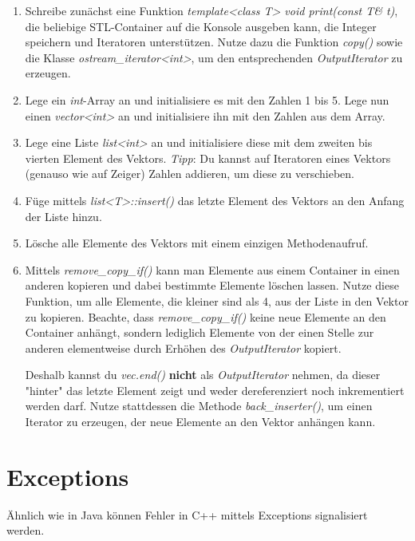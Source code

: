 \begin{enumerate}
\item 
Schreibe zunächst eine Funktion \emph{template<class T> void print(const T\& t)}, die beliebige STL-Container auf die Konsole ausgeben kann, die Integer speichern und Iteratoren unterstützen.
Nutze dazu die Funktion \emph{copy()} sowie die Klasse \emph{ostream\_iterator<int>}, um den entsprechenden \emph{OutputIterator} zu erzeugen.

\item
Lege ein \emph{int}-Array an und initialisiere es mit den Zahlen 1 bis 5.
Lege nun einen \emph{vector<int>} an und initialisiere ihn mit den Zahlen aus dem Array.

\item
Lege eine Liste \emph{list<int>} an und initialisiere diese mit dem zweiten bis vierten Element des Vektors.
\emph{Tipp}: Du kannst auf Iteratoren eines Vektors (genauso wie auf Zeiger) Zahlen addieren, um diese zu verschieben.

\item
Füge mittels \emph{list<T>::insert()} das letzte Element des Vektors an den Anfang der Liste hinzu.

\item
Lösche alle Elemente des Vektors mit einem einzigen Methodenaufruf.

\item
Mittels \emph{remove\_copy\_if()} kann man Elemente aus einem Container in einen anderen kopieren und dabei bestimmte Elemente löschen lassen.
Nutze diese Funktion, um alle Elemente, die kleiner sind als 4, aus der Liste in den Vektor zu kopieren. Beachte, dass \emph{remove\_copy\_if()} keine neue Elemente an den Container anhängt, sondern lediglich Elemente von der einen Stelle zur anderen elementweise durch Erhöhen des \emph{OutputIterator} kopiert.

Deshalb kannst du \emph{vec.end()} \textbf{nicht} als \emph{OutputIterator} nehmen, da dieser "{}hinter"{} das letzte Element zeigt und weder dereferenziert noch inkrementiert werden darf. Nutze stattdessen die Methode \emph{back\_inserter()}, um einen Iterator zu erzeugen, der neue Elemente an den Vektor anhängen kann.
\end{enumerate}

\section{Exceptions}
Ähnlich wie in Java können Fehler in C++ mittels Exceptions signalisiert werden.

